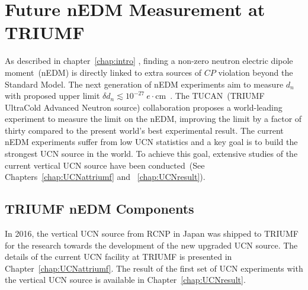 \chapter{Future nEDM Measurement at TRIUMF\label{chap:nedm}}

As described in chapter~\ref{chap:intro} , finding a non-zero neutron
electric dipole moment~(nEDM) is directly linked to extra sources of
$CP$ violation beyond the Standard Model.  The next generation of nEDM
experiments aim to measure $d_n$ with proposed upper limit
$\delta d_n\lesssim
10^{-27}~e\cdot$cm~\cite{serebrov2014new,serebrov2011supersource,Kirch_talk,baker2011search,altarev2012next,golub1994neutron,ito2007plans,picker2017minuscule}.
The TUCAN~(TRIUMF UltraCold Advanced Neutron source) collaboration
proposes a world-leading experiment to measure the limit on the nEDM,
improving the limit by a factor of thirty compared to the present
world’s best experimental result. The current nEDM experiments suffer
from low UCN statistics and a key goal is to build the strongest UCN
source in the world. To achieve this goal, extensive studies of the
current vertical UCN source have been conducted~(See
Chapters~\ref{chap:UCNattriumf} and ~\ref{chap:UCNresult}).



\section{TRIUMF nEDM Components~\label{sec:triumfnedm}}
In 2016, the vertical UCN source from RCNP in Japan was shipped to
TRIUMF for the research towards the development of the new upgraded
UCN source.  The details of the current UCN facility at TRIUMF is
presented in Chapter~\ref{chap:UCNattriumf}. The result of the first
set of UCN experiments with the vertical UCN source is available in
Chapter~\ref{chap:UCNresult}.




